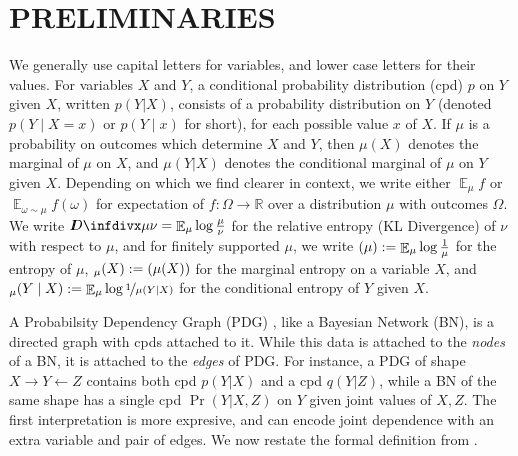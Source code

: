 \documentclass[twoside]{article}
\theoremstyle{plain}
\theoremstyle{definition}
\let\H\relax
\DeclareMathOperator{\H}{\mathrm{H}} %
\DeclareMathOperator*{\Ex}{\mathbb{E}} %
\newcommand{\thickD}{I\mkern-8muD}
\newcommand{\kldiv}{\thickD\infdivx}
\newcommand{\ed}[3]{%
		\mathchoice%
		{#2\overset{\smash{\mskip-5mu\raisebox{-3pt}{${#1}$}}}{\xrightarrow{\hphantom{\scriptstyle {#1}}}} #3} %
		{#2\overset{\smash{\mskip-5mu\raisebox{-3pt}{$\scriptstyle {#1}$}}}{\xrightarrow{\hphantom{\scriptstyle {#1}}}} #3}%
		{#2\overset{\smash{\mskip-5mu\raisebox{-3pt}{$\scriptscriptstyle {#1}$}}}{\xrightarrow{\hphantom{\scriptscriptstyle {#1}}}} #3} %
		{#2\overset{\smash{\mskip-5mu\raisebox{-3pt}{$\scriptscriptstyle {#1}$}}}{\xrightarrow{\hphantom{\scriptscriptstyle {#1}}}} #3}} %
\begin{document}
\section{PRELIMINARIES}
We generally use capital letters for variables, and lower case letters for their values.
For variables $X$ and $Y$, a conditional probability distribution (cpd) $p$ on $Y$ given $X$, written $p(Y|X)$, consists of a probability distribution on $Y$ (denoted $p(Y\mid X\!=\!x)$ or $p(Y\mid x)$ for short), for each possible value $x$ of $X$.
If $\mu$ is a probability on outcomes which determine $X$ and $Y$, then $\mu(X)$ denotes the marginal of $\mu$ on $X$, and $\mu(Y|X)$ denotes the conditional marginal of $\mu$ on  $Y$ given $X$.
Depending on which we find clearer in context, we write either $\Ex_\mu f$ or $\Ex_{\omega \sim \mu} f(\omega)$ for expectation of $f : \Omega \to \mathbb R$ over a distribution $\mu$ with outcomes $\Omega$.
We write $\kldiv\mu\nu = \Ex_\mu \log \frac{\mu}{\nu}$ for the relative entropy (KL Divergence) of $\nu$ with respect to $\mu$, and for finitely supported $\mu$, we write $\H(\mu) := \Ex_\mu \log\frac1\mu$ for the entropy of $\mu$, $\H_\mu(X):= \H(\mu(X))$ for the marginal entropy on a variable $X$, and $\H_\mu(Y \mid X):= \Ex_\mu \log \nicefrac1{\mu(Y|X)}$ for the conditional entropy of $Y$ given $X$.

A Probabilsity Dependency Graph (PDG) \cite{richardson2020probabilistic}, like a Bayesian Network (BN), is a directed graph with cpds attached to it. While this data is attached to the \emph{nodes} of a BN, it is attached to the \emph{edges} of PDG.
For instance, a PDG of shape $X \to Y \leftarrow Z$ contains both cpd $p(Y | X)$ and a cpd $q(Y | Z)$, while a BN of the same shape has a single cpd $\Pr(Y | X,Z)$ on $Y$ given joint values of $X,Z$.
The first interpretation is more expresive, and can encode joint dependence with an extra variable and pair of edges.
We now restate the formal definition from \cite{richardson2020probabilistic}.
\end{document}
